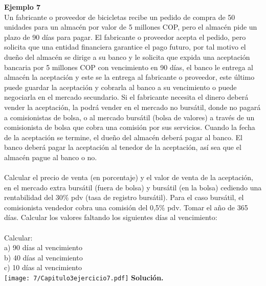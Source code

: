 
\textbf{Ejemplo 7}\\
Un fabricante o proveedor de bicicletas recibe un pedido de compra de 50 unidades para un almacén por valor de 5 millones COP, pero el almacén pide un plazo de 90 días para pagar. El fabricante o proveedor acepta el pedido, pero solicita que una entidad financiera garantice el pago futuro, por tal motivo el dueño del almacén se dirige a su banco y le solicita que expida una aceptación bancaria por 5 millones COP con vencimiento en 90 días, el banco le entrega al almacén la aceptación y este se la entrega al fabricante o proveedor, este último puede guardar la aceptación y cobrarla al banco a su vencimiento o puede negociarla en el mercado secundario. Si el fabricante necesita el dinero deberá vender la aceptación, la podrá vender en el mercado no bursátil, donde no pagará a comisionistas de bolsa, o al mercado bursátil (bolsa de valores) a través de un comisionista de bolsa que cobra una comisión por sus servicios. Cuando la fecha de la aceptación se termine, el dueño del almacén deberá pagar al banco. El banco deberá pagar la aceptación al tenedor de la aceptación, así sea que el almacén pague al banco o no.
\\ \\
Calcular el precio de venta (en porcentaje) y el valor de venta de la aceptación, en el mercado extra bursátil (fuera de bolsa) y bursátil (en la bolsa) cediendo una rentabilidad del 30\% pdv (tasa de registro bursátil). Para el caso bursátil, el comisionista vendedor cobra una comisión del 0,5\% pdv. Tomar el año de 365 días. Calcular los valores faltando los siguientes días al vencimiento:
\\ \\
Calcular:\\
    a) 90 días al vencimiento\\
    b) 40 días al vencimiento \\
    c) 10 días al vencimiento \\
\texttt{[image: 7/Capitulo3ejercicio7.pdf]}\newline
\newpage
\textbf{Solución.}\\

